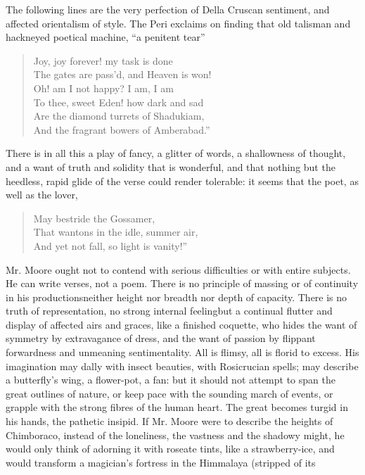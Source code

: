 The following lines are the very perfection of Della Cruscan sentiment,
and affected orientalism of style. The Peri exclaims on finding that old
talisman and hackneyed poetical machine, ``a penitent tear''\textemdash 
\begin{verse}
  Joy, joy forever! my task is done\textemdash \\
  The gates are pass'd, and Heaven is won!\\
  Oh! am I not happy? I am, I am\textemdash \\
  To thee, sweet Eden! how dark and sad\\
  Are the diamond turrets of Shadukiam,\\
  And the fragrant bowers of Amberabad.''
\end{verse}
There is in all this a play of fancy, a glitter of words, a shallowness
of thought, and a want of truth and solidity that is wonderful, and
that nothing but the heedless, rapid glide of the verse could render
tolerable: it seems that the poet, as well as the lover,
\begin{verse}
  May bestride the Gossamer,\\
  That wantons in the idle, summer air,\\
  And yet not fall, so light is vanity!''
\end{verse}
Mr. Moore ought not to contend with serious difficulties or with entire
subjects. He can write verses, not a poem. There is no principle of
massing or of continuity in his productions\textemdash neither height nor breadth
nor depth of capacity. There is no truth of representation, no strong
internal feeling\textemdash but a continual flutter and display of affected airs
and graces, like a finished coquette, who hides the want of symmetry by
extravagance of dress, and the want of passion by flippant forwardness
and unmeaning sentimentality. All is flimsy, all is florid to excess.
His imagination may dally with insect beauties, with Rosicrucian spells;
may describe a butterfly's wing, a flower-pot, a fan: but it should not
attempt to span the great outlines of nature, or keep pace with the
sounding march of events, or grapple with the strong fibres of the human
heart. The great becomes turgid in his hands, the pathetic insipid. If
Mr. Moore were to describe the heights of Chimboraco, instead of the
loneliness, the vastness and the shadowy might, he would only think
of adorning it with roseate tints, like a strawberry-ice, and would
transform a magician's fortress in the Himmalaya (stripped of its
